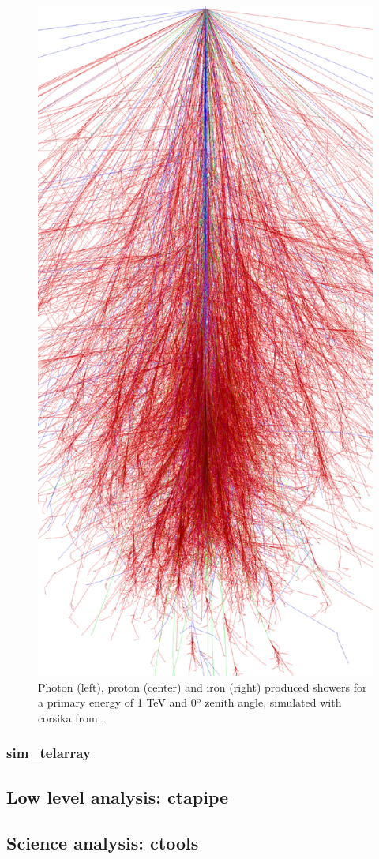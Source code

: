 \documentclass[main.tex]{subfiles}
\begin{document}
\begin{figure}[!htb]
  \includegraphics[width=\linewidth]{Pictures/iron_12_0deg.pdf}
  \endminipage\hfill
  \caption{\label{fig:corsika} Photon (left), proton (center) and iron (right) produced showers for a primary energy of 1 TeV and 0º zenith angle, simulated with \gls{corsika} from \cite{corsikaimages}.}
\end{figure}

\subsubsection{sim\_telarray}
\subsection{Low level analysis: ctapipe}
\subsection{Science analysis: ctools}
\end{document}
